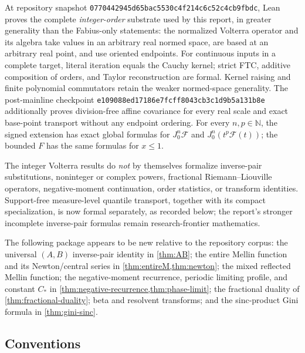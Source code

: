 \documentclass[11pt,oneside]{article}
\theoremstyle{definition}
\newcommand{\F}{F}
\newcommand{\N}{\mathbb N}
\begin{document}
\begin{statusbox}
At repository snapshot
\texttt{0770442945d65bac5530c4f214c6c52c4cb9fbdc}, Lean proves the complete
\emph{integer-order} substrate used by this report, in greater generality than the
Fabius-only statements: the normalized Volterra operator and its algebra take values in an
arbitrary real normed space, are based at an arbitrary real point, and use oriented
endpoints.  For continuous inputs in a complete target, literal iteration equals the
Cauchy kernel; strict FTC, additive composition of orders, and Taylor reconstruction are
formal.  Kernel raising and finite polynomial commutators retain the weaker normed-space
generality.  The post-mainline checkpoint
\texttt{e109088ed17186e7fcff8043cb3c1d9b5a131b8e} additionally proves division-free
affine covariance for every real scale and exact base-point transport without any endpoint
ordering.
For every \(n,p\in\N\), the signed extension has exact global formulas for
\(J_0^n\mathcal F\) and \(J_0^n(t^p\mathcal F(t))\); the bounded \(\F\) has the same
formulas for \(x\le1\).

The integer Volterra results do \emph{not} by themselves formalize inverse-pair
substitutions, noninteger or complex powers, fractional Riemann--Liouville operators,
negative-moment continuation, order statistics, or transform identities.  Support-free
measure-level quantile transport, together with its compact specialization, is now formal
separately, as recorded below; the report's stronger incomplete inverse-pair formulas remain
research-frontier mathematics.
\end{statusbox}

\begin{resultbox}
The following package appears to be new relative to the repository corpus: the universal
\((A,B)\) inverse-pair identity in \cref{thm:AB}; the entire Mellin function and its
Newton/central series in \cref{thm:entireM,thm:newton}; the mixed reflected Mellin
function; the negative-moment recurrence, periodic limiting profile, and constant
\(C_*\) in \cref{thm:negative-recurrence,thm:phase-limit}; the fractional duality of
\cref{thm:fractional-duality}; beta and resolvent transforms; and the sinc-product
Gini formula in \cref{thm:gini-sinc}.
\end{resultbox}

\subsection{Conventions}
\end{document}
